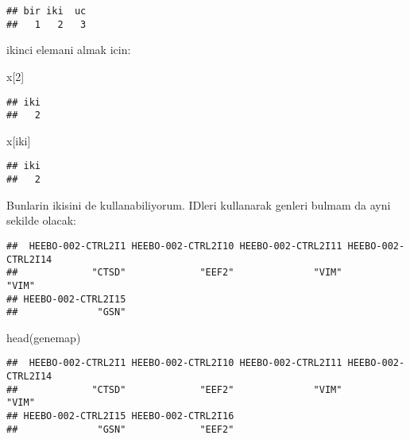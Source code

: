 \documentclass[
]{book}
\newenvironment{Shaded}{\begin{snugshade}}{\end{snugshade}}
\newcommand{\DecValTok}[1]{\textcolor[rgb]{0.00,0.00,0.81}{#1}}
\newcommand{\FunctionTok}[1]{\textcolor[rgb]{0.00,0.00,0.00}{#1}}
\newcommand{\NormalTok}[1]{#1}
\newcommand{\OtherTok}[1]{\textcolor[rgb]{0.56,0.35,0.01}{#1}}
\newcommand{\SpecialCharTok}[1]{\textcolor[rgb]{0.00,0.00,0.00}{#1}}
\newcommand{\StringTok}[1]{\textcolor[rgb]{0.31,0.60,0.02}{#1}}
\begin{document}
\begin{verbatim}
## bir iki  uc 
##   1   2   3
\end{verbatim}

ikinci elemani almak icin:

\begin{Shaded}
\begin{Highlighting}[]
\NormalTok{x[}\DecValTok{2}\NormalTok{]}
\end{Highlighting}
\end{Shaded}

\begin{verbatim}
## iki 
##   2
\end{verbatim}

\begin{Shaded}
\begin{Highlighting}[]
\NormalTok{x[}\StringTok{\textquotesingle{}iki\textquotesingle{}}\NormalTok{]}
\end{Highlighting}
\end{Shaded}

\begin{verbatim}
## iki 
##   2
\end{verbatim}

Bunlarin ikisini de kullanabiliyorum. IDleri kullanarak genleri bulmam da ayni sekilde olacak:

\begin{Shaded}
\end{Shaded}

\begin{verbatim}
##  HEEBO-002-CTRL2I1 HEEBO-002-CTRL2I10 HEEBO-002-CTRL2I11 HEEBO-002-CTRL2I14 
##             "CTSD"             "EEF2"              "VIM"              "VIM" 
## HEEBO-002-CTRL2I15 
##              "GSN"
\end{verbatim}

\begin{Shaded}
\begin{Highlighting}[]
\FunctionTok{head}\NormalTok{(genemap)}
\end{Highlighting}
\end{Shaded}

\begin{verbatim}
##  HEEBO-002-CTRL2I1 HEEBO-002-CTRL2I10 HEEBO-002-CTRL2I11 HEEBO-002-CTRL2I14 
##             "CTSD"             "EEF2"              "VIM"              "VIM" 
## HEEBO-002-CTRL2I15 HEEBO-002-CTRL2I16 
##              "GSN"             "EEF2"
\end{verbatim}
\end{document}
